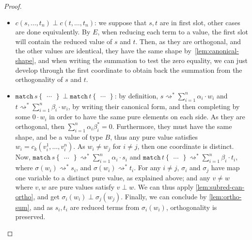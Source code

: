 \documentclass[10pt,a4paper]{article}
\newcommand{\bvar}{B}
\newcommand{\textmatch}{\ensuremath{\mathtt{match}}}
\newcommand{\match}[2]{
  \textmatch\,#1\left\{\! \begin{aligned} #2 \end{aligned}\right\}
}
\newcommand{\reduces}{\rightsquigarrow}
\newcommand{\sreduces}{\reduces^*}
\newcommand{\evalcontext}{\ensuremath{E}}
\begin{document}
\begin{proof}
\begin{itemize}
\begin{itemize}
        \item $c(s, \dots, t_n) \perp c(t, \dots, t_n)$: we suppose
          that $s, t$ are in first slot, other cases are done equivalently.
          By \evalcontext, when reducing each term to a value, the
          first slot will contain the reduced value of $s$ and $t$.
          Then, as they are orthogonal, and the other values are
          identical, they have the same shape
          by~\autoref{lem:canonical-shape}, and when writing the
          summation to test the zero equality,
          we can just develop through the first coordinate to obtain
          back the summation from the orthogonality of $s$ and $t$.
        \item $\match s \dots \perp \match t \dots$: by definition,
          $s \sreduces \sum_{i=1}^n \alpha_i \cdot w_i$ and $t
          \sreduces \sum_{i=1}^n \beta_i \cdot w_i$,
          by writing their canonical form, and then completing by
          some $0 \cdot w_i$ in order to have the same pure elements
          on each side.
          As they are orthogonal, then $\sum_{i=1}^n \alpha_i \beta_i^* = 0$.
          Furthermore, they must have the same shape, and be a value
          of type $\bvar$, thus any pure value satisfies $w_i =
          c_k(v_i^1, \dots, v_i^n)$.
          As $w_i \neq w_j$ for $i \neq j$, then one coordinate is distinct.
          Now, $\match s \dots \sreduces \sum_{i=1}^n \alpha_i \cdot
          s_i$ and $\match t \dots \sreduces \sum_{i=1}^n
          \beta_i \cdot t_i$, where $\sigma(w_i) \sreduces s_i$,
          and $\sigma(w_i) \sreduces t_i$.
          For any $i \neq j$, $\sigma_i$ and $\sigma_j$ have map one
          variable to a distinct pure value, as explained above;
          and any $v \neq w$ where $v, w$ are pure values satisfy $v \perp w$.
          We can thus apply \autoref{lem:subred-can-ortho}, and get
          $\sigma_i(w_i) \perp \sigma_j(w_j)$.
          Finally, we can conclude by \autoref{lem:ortho-sum},
          and as $s_i, t_i$ are reduced terms from $\sigma_i(w_i)$,
          orthogonality is preserved.
      \end{itemize}


\end{itemize}
\end{proof}
\end{document}
